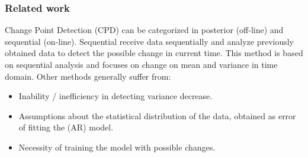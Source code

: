 \subsubsection{Related work}
Change Point Detection (CPD) can be categorized in posterior (off-line) and sequential (on-line).
Sequential receive data sequentially and analyze previously obtained data to detect the possible change in current time.
This method is based on sequential analysis and focuses on change on mean and variance in time domain.
Other methods generally suffer from:
\begin{itemize}
  \item Inability / inefficiency in detecting variance decrease.
  \item Assumptions about the statistical distribution of the data, obtained as error of fitting the (AR) model.
  \item Necessity of training the model with possible changes.
\end{itemize}

